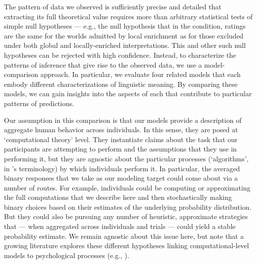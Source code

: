 \documentclass[leqno,12pt]{article}
\begin{document}
The pattern of data we observed is sufficiently precise and detailed
that extracting its full theoretical value requires more than
arbitrary statistical tests of simple null hypotheses --- e.g., the null
hypothesis that in the  condition, ratings
are the same for the worlds admitted by local enrichment as for those
excluded under both global and locally-enriched interpretations.  This
and other such null hypotheses can be rejected with high confidence.
Instead, to characterize the patterns of inference that give rise to
the observed data, we use a model-comparison approach. In particular,
we evaluate four related models that each embody different
characterizations of linguistic meaning. By comparing these models, we
can gain insights into the aspects of each that contribute to
particular patterns of predictions.

Our assumption in this comparison is that our models provide a
description of aggregate human behavior across individuals. In this
sense, they are posed at  `computational theory'
level. They instantiate claims about the task that our participants
are attempting to perform and the assumptions that they use in
performing it, but they are agnostic about the particular processes
(`algorithms', in \citeauthor{marr1982}'s terminology) by which
individuals perform it. In particular, the averaged binary responses
that we take as our modeling target could come about via a number of
routes. For example, individuals could be computing or approximating
the full computations that we describe here and then stochastically
making binary choices based on their estimates of the underlying
probability distribution. But they could also be pursuing any number
of heuristic, approximate strategies that --- when aggregated across
individuals and trials --- could yield a stable probability
estimate. We remain agnostic about this issue here, but note that a
growing literature explores these different hypotheses linking
computational-level models to psychological processes (e.g.,
\citealt{bonawitz2014,griffiths2014,sanborn2010,vul2014}).
\end{document}
